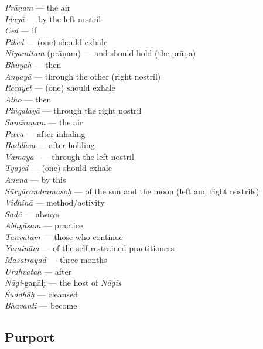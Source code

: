\begin{multicols}{2}
\textit{Prāṇam} --- the air \\
\textit{Iḍayā} --- by the left nostril \\
\textit{Ced} --- if \\
\textit{Pibed} --- (one) should exhale \\
\textit{Niyamitam} (prāṇam) --- and should hold (the prāṇa) \\
\textit{Bhūyaḥ} --- then \\
\textit{Anyayā} --- through the other (right nostril) \\
\textit{Recayet} --- (one) should exhale \\
\textit{Atho} --- then \\
\textit{Piṅgalayā} --- through the right nostril \\
\textit{Samīraṇam} --- the air \\
\textit{Pītvā} --- after inhaling \\
\textit{Baddhvā} --- after holding\\ 
\textit{Vāmayā } --- through the left nostril \\
\textit{Tyajed} --- (one) should exhale \\
\textit{Anena} --- by this \\
\textit{Sūryācandramasoḥ} --- of the sun and the moon (left and right nostrils)\\
\textit{Vidhinā} --- method/activity \\
\textit{Sadā}  --- always \\
\textit{Abhyāsam} --- practice \\
\textit{Tanvatām} --- those who continue \\
\textit{Yaminām} --- of the self-restrained practitioners\\
\textit{Māsatrayād} --- three months \\
\textit{Ūrdhvataḥ} --- after \\
\textit{Nāḍi}-gaṇāḥ --- the host of \textit{Nāḍīs} \\
\textit{Śuddhāḥ} --- cleansed \\
\textit{Bhavanti}  --- become
\end{multicols}

\subsection*{Purport}


